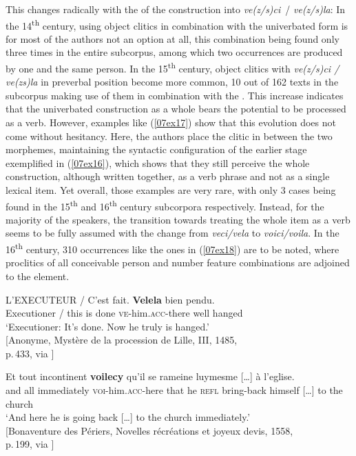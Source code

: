 \documentclass[output=paper,colorlinks,citecolor=brown]{langscibook}
\begin{document}
\largerpage[2]

This changes radically with the  of the construction into \emph{ve(z/s)ci}~/ \emph{ve(z/s)la}: In the 14\textsuperscript{th} century, using object clitics in combination with the univerbated form is for most of the authors not an option at all, this combination being found only three times in the entire subcorpus, among which two occurrences are produced by one and the same person. In the 15\textsuperscript{th} century, object clitics with \emph{ve(z/s)ci / ve(zs)la} in preverbal position become more common, 10 out of 162 texts in the subcorpus making use of them in combination with the . This increase indicates that the univerbated construction as a whole bears the potential to be processed as a verb. However, examples like (\ref{07ex17}) show that this evolution does not come without hesitancy. Here, the authors place the clitic in between the two morphemes, maintaining the syntactic configuration of the earlier stage exemplified in (\ref{07ex16}), which shows that they still perceive the whole construction, although written together, as a verb phrase and not as a single lexical item. Yet overall, those examples are very rare, with only 3 cases being found in the 15\textsuperscript{th} and 16\textsuperscript{th} century subcorpora respectively. Instead, for the majority of the speakers, the transition towards treating the whole item as a verb seems to be fully assumed with the change from \emph{veci/vela} to \emph{voici/voila}. In the 16\textsuperscript{th} century, 310 occurrences like the ones in (\ref{07ex18}) are to be noted, where proclitics of all conceivable person and number feature combinations are adjoined to the  element.

\begin{exe}
	\ex \label{07ex17}
	\begin{xlist}
		\ex \gll L'EXECUTEUR / C'est fait. \textbf{Velela} bien pendu. \\
		Executioner / {this is} done \textsc{ve-}him.\textsc{acc}-there well hanged \\
		\trans ‘Executioner: It’s done. Now he truly is hanged.’ \\
		\hfill [Anonyme, Mystère de la procession de Lille, III, 1485, \\
		\hfill p. 433, via \citeauthor{frantext}]
		
		\ex \gll Et tout incontinent \textbf{voilecy} qu'il se rameine luymesme […] à l'eglise. \\
		and all immediately \textsc{voi-}him.\textsc{acc}-here {that he} \textsc{refl} bring-back himself […] to {the church} \\
		\trans ‘And here he is going back […] to the church immediately.’ \\
		\hfill [Bonaventure des Périers, Novelles récréations et joyeux devis, 1558, \\
		\hfill p. 199, via \citeauthor{frantext}]
	\end{xlist}
\end{exe}
\end{document}
